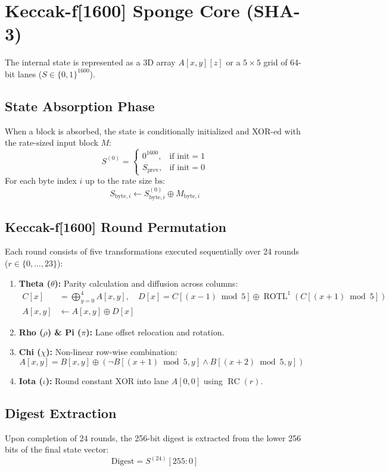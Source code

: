 \documentclass[11pt, a4paper]{article}
\begin{document}
\section{Keccak-f[1600] Sponge Core (SHA-3)}
The internal state is represented as a 3D array $A[x, y][z]$ or a $5 \times 5$ grid of 64-bit lanes ($S \in \{0, 1\}^{1600}$).

\subsection{State Absorption Phase}
When a block is absorbed, the state is conditionally initialized and XOR-ed with the rate-sized input block $M$:
\begin{equation}
    S^{(0)} = \begin{cases} 
    0^{1600}, & \text{if } \text{init} = 1 \\
    S_{\text{prev}}, & \text{if } \text{init} = 0
    \end{cases}
\end{equation}
For each byte index $i$ up to the rate size $\text{bs}$:
\begin{equation}
    S_{\text{byte}, i} \leftarrow S_{\text{byte}, i}^{(0)} \oplus M_{\text{byte}, i}
\end{equation}

\subsection{Keccak-f[1600] Round Permutation}
Each round consists of five transformations executed sequentially over 24 rounds ($r \in \{0, \dots, 23\}$):
\begin{enumerate}
    \item \textbf{Theta ($\theta$):} Parity calculation and diffusion across columns:
    \begin{align*}
        C[x] &= \bigoplus_{y=0}^{4} A[x, y], \quad D[x] = C[(x-1) \bmod 5] \oplus \operatorname{ROTL}^1\left(C[(x+1) \bmod 5]\right) \\
        A[x, y] &\leftarrow A[x, y] \oplus D[x]
    \end{align*}
    \item \textbf{Rho ($\rho$) \& Pi ($\pi$):} Lane offset relocation and rotation.
    \item \textbf{Chi ($\chi$):} Non-linear row-wise combination:
    \begin{equation*}
        A[x, y] = B[x, y] \oplus \left(\neg B[(x+1) \bmod 5, y] \land B[(x+2) \bmod 5, y]\right)
    \end{equation*}
    \item \textbf{Iota ($\iota$):} Round constant XOR into lane $A[0, 0]$ using $\operatorname{RC}(r)$.
\end{enumerate}

\subsection{Digest Extraction}
Upon completion of 24 rounds, the 256-bit digest is extracted from the lower 256 bits of the final state vector:
\begin{equation}
    \text{Digest} = S^{(24)}[255 : 0]
\end{equation}
\end{document}
